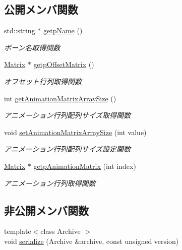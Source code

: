 \subsection*{公開メンバ関数}
\begin{DoxyCompactItemize}
\item 
std\+::string $\ast$ \mbox{\hyperlink{class_md_bin_data_1_1_mesh_1_1_bone_a7a132ac01755ee4a6bca3c25ad3da42c}{getp\+Name}} ()
\begin{DoxyCompactList}\small\item\em ボーン名取得関数 \end{DoxyCompactList}\item 
\mbox{\hyperlink{class_md_bin_data_1_1_matrix}{Matrix}} $\ast$ \mbox{\hyperlink{class_md_bin_data_1_1_mesh_1_1_bone_a0e5d6012c7efa481bbb40cc86b8a0856}{getp\+Offset\+Matrix}} ()
\begin{DoxyCompactList}\small\item\em オフセット行列取得関数 \end{DoxyCompactList}\item 
int \mbox{\hyperlink{class_md_bin_data_1_1_mesh_1_1_bone_ad59efa7e03e444dabbdfef7848091ab9}{get\+Animation\+Matrix\+Array\+Size}} ()
\begin{DoxyCompactList}\small\item\em アニメーション行列配列サイズ取得関数 \end{DoxyCompactList}\item 
void \mbox{\hyperlink{class_md_bin_data_1_1_mesh_1_1_bone_af7edfd3047be8f110d4ab995738c6af3}{set\+Animation\+Matrix\+Array\+Size}} (int value)
\begin{DoxyCompactList}\small\item\em アニメーション行列配列サイズ設定関数 \end{DoxyCompactList}\item 
\mbox{\hyperlink{class_md_bin_data_1_1_matrix}{Matrix}} $\ast$ \mbox{\hyperlink{class_md_bin_data_1_1_mesh_1_1_bone_ac185537ff78d9e8e78c7d6845425f615}{getp\+Animation\+Matrix}} (int index)
\begin{DoxyCompactList}\small\item\em アニメーション行列取得関数 \end{DoxyCompactList}\end{DoxyCompactItemize}
\subsection*{非公開メンバ関数}
\begin{DoxyCompactItemize}
\item 
{\footnotesize template$<$class Archive $>$ }\\void \mbox{\hyperlink{class_md_bin_data_1_1_mesh_1_1_bone_aa28ecffb26fc5ae631664ae97c099a25}{serialize}} (Archive \&archive, const unsigned version)
\end{DoxyCompactItemize}
